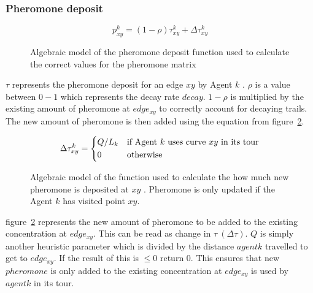 \subsubsection{Pheromone deposit}
\label{sssec:pherodepo}
\begin{figure}[H]
\Large
\begin{equation}
p_{xy}^{k} = (1 - \rho)\tau_{xy}^{k} + \Delta\tau_{xy}^{k}
\end{equation}

\caption[Pheromone Function]{Algebraic model of the pheromone deposit function used to calculate the correct values for the pheromone matrix
\label{fig:pheromonefunc}
\cite{pheromone:image}}
\end{figure}

\noindent
$\tau$ represents the pheromone deposit for an edge $xy$ by Agent $k$ \cite{tjung:aco:blog}. $\rho$ is a value between $0-1$ which represents the decay rate $decay$. $1 - \rho$ is multiplied by the existing amount of pheromone at $edge_{xy}$ to correctly account for decaying trails. The new amount of pheromone is then added using the equation from figure~\ref{fig:newpheromonefunc}. 


\begin{figure}[H]
\Large
\begin{equation}
\Delta\tau_{xy}^{k} = 
\begin{dcases*}
Q/L_k & \text{if Agent $k$ uses curve $xy$ in its tour}\\
0 & \text{otherwise}
\end{dcases*}
\end{equation}

\caption[New Pheromone Function]{Algebraic model of the function used to calculate the how much new pheromone is deposited at $xy$
\label{fig:newpheromonefunc}
\cite{new:pheromone:image}. Pheromone is only updated if the Agent $k$ has visited point $xy$.}

\end{figure}

\noindent
figure~\ref{fig:newpheromonefunc} represents the new amount of pheromone to be added to the existing concentration at $edge_{xy}$. This can be read as change in $\tau\ (\Delta \tau)$. $Q$ is simply another heuristic parameter which is divided by the distance $agent k$ travelled to get to $edge_{xy}$. If the result of this is $\leq 0$ return 0. This ensures that new $pheromone$ is only added to the existing concentration at $edge_{xy}$ is used by $agent k$ in its tour.

